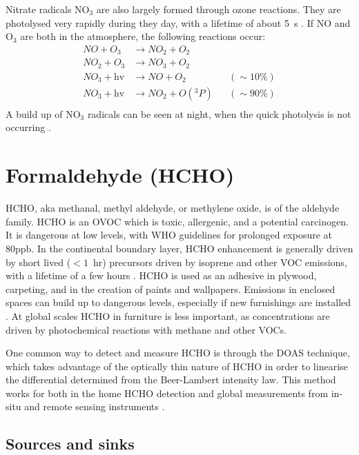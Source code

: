     Nitrate radicals NO$_3$ are also largely formed through ozone reactions.
    They are photolysed very rapidly during they day, with a lifetime of about 5~s \citep{Atkinson2000}.
    If NO and O$_3$ are both in the atmosphere, the following reactions \citep{Atkinson2000} occur:
    \begin{align*}
      NO + O_3         & \to NO_2 + O_2      && \\%
      NO_2 + O_3       & \to NO_3 + O_2      && \\%
      NO_3 + \text{hv} & \to NO + O_2        && (\sim 10\%) \\%
      NO_3 + \text{hv} & \to NO_2 + O({}^3P) && (\sim 90\%) \\%
    \end{align*}
    A build up of NO$_3$ radicals can be seen at night, when the quick photolysis is not occurring \citep{Atkinson2000,Brown2009}.

\section{Formaldehyde (HCHO)}
  \label{LR:O3andAQ:HCHO}
  
  HCHO, aka methanal, methyl aldehyde, or methylene oxide, is of the aldehyde family.
  HCHO is an OVOC which is toxic, allergenic, and a potential carcinogen. 
  It is dangerous at low levels, with WHO guidelines for prolonged exposure at 80ppb.
  In the continental boundary layer, HCHO enhancement is generally driven by short lived ($<1$~hr) precursors driven by isoprene and other VOC emissions, with a lifetime of a few hours \citep{Kefauver2014}.
  HCHO is used as an adhesive in plywood, carpeting, and in the creation of paints and wallpapers.
  Emissions in enclosed spaces can build up to dangerous levels, especially if new furnishings are installed \citep{Davenport2015}.
  At global scales HCHO in furniture is less important, as concentrations are driven by photochemical reactions with methane and other VOCs.
  
  One common way to detect and measure HCHO is through the DOAS technique, which takes advantage of the optically thin nature of HCHO in order to linearise the differential determined from the Beer-Lambert intensity law.
  This method works for both in the home HCHO detection and global measurements from in-situ and remote sensing instruments \citep{Guenther1995, Abad2015, Davenport2015}.
  
  \subsection{Sources and sinks}
    
